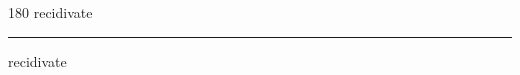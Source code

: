 
\begin{frame}
\begin{center}
\begin{turn}{180}
{\fontsize{2.5cm}{1em}\selectfont recidivate}
\end{turn}
\vspace{1em}\par  
\hrule
\vspace{1em}\par  
{\fontsize{2.5cm}{1em}\selectfont recidivate}
\end{center}
\end{frame}
